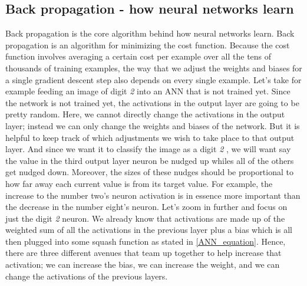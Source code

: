 \documentclass[master]{thesis-uestc}
\begin{document}
\subsection{Back propagation - how neural networks learn}
Back propagation is the core algorithm behind how neural networks learn. Back propagation is an algorithm for minimizing the cost function. Because the cost function involves averaging a certain cost per example over all the tens of thousands of training examples, the way that we adjust the weights and biases for a single gradient descent step also depends on every single example. Let's take for example feeding an image of digit \textit{2}  into an ANN that is not trained yet. Since the network is not trained yet, the activations in the output layer are going to be pretty random. Here, we cannot directly change the activations in the output layer; instead we can only change the weights and biases of the network. But it is helpful to keep track of which adjustments we wish to take place to that output layer. And since we want it to classify the image as a digit \textit{2} , we will want say the value in the third output layer neuron be nudged up whiles all of the others get nudged down. Moreover, the sizes of these nudges should be proportional to how far away each current value is from its target value. For example, the increase to the number two's neuron activation is in essence more important than the decrease in the number eight's neuron. Let's zoom in further and focus on just the digit \textit{2} neuron. We already know that activations are made up of the weighted sum of all the activations in the previous layer plus a bias which is all then plugged into some squash function as stated in \ref{ANN_equation}. Hence, there are three different avenues that team up together to help increase that activation; we can increase the bias, we can increase the weight, and we can change the activations of the previous layers.
\end{document}
